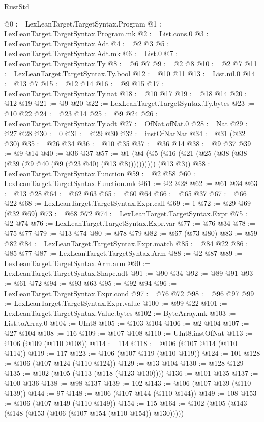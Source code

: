 \begin{lexlean}{RustStd}
\begin{coremodule}
@0 := LexLeanTarget.TargetSyntax.Program
@1 := LexLeanTarget.TargetSyntax.Program.mk
@2 := List.cons.{0}
@3 := LexLeanTarget.TargetSyntax.Adt
@4 := @2 @3
@5 := LexLeanTarget.TargetSyntax.Adt.mk
@6 := List.{0}
@7 := LexLeanTarget.TargetSyntax.Ty
@8 := @6 @7
@9 := @2 @8
@10 := @2 @7
@11 := LexLeanTarget.TargetSyntax.Ty.bool
@12 := @10 @11
@13 := List.nil.{0}
@14 := @13 @7
@15 := @12 @14
@16 := @9 @15
@17 := LexLeanTarget.TargetSyntax.Ty.nat
@18 := @10 @17
@19 := @18 @14
@20 := @12 @19
@21 := @9 @20
@22 := LexLeanTarget.TargetSyntax.Ty.bytes
@23 := @10 @22
@24 := @23 @14
@25 := @9 @24
@26 := LexLeanTarget.TargetSyntax.Ty.adt
@27 := OfNat.ofNat.{0}
@28 := Nat
@29 := @27 @28
@30 := 0
@31 := @29 @30
@32 := instOfNatNat
@34 := @31 (@32 @30)
@35 := @26 @34
@36 := @10 @35
@37 := @36 @14
@38 := @9 @37
@39 := @9 @14
@40 := @36 @37
@57 := @1 (@4 (@5 (@16 (@21 (@25 (@38 (@38 (@39 (@9 @40 (@9 (@23 @40) (@13 @8)))))))))) (@13 @3))
@58 := LexLeanTarget.TargetSyntax.Function
@59 := @2 @58
@60 := LexLeanTarget.TargetSyntax.Function.mk
@61 := @2 @28
@62 := @61 @34
@63 := @13 @28
@64 := @62 @63
@65 := @60 @64
@66 := @65 @37
@67 := @66 @22
@68 := LexLeanTarget.TargetSyntax.Expr.call
@69 := 1
@72 := @29 @69 (@32 @69)
@73 := @68 @72
@74 := LexLeanTarget.TargetSyntax.Expr
@75 := @2 @74
@76 := LexLeanTarget.TargetSyntax.Expr.var
@77 := @76 @34
@78 := @75 @77
@79 := @13 @74
@80 := @78 @79
@82 := @67 (@73 @80)
@83 := @59 @82
@84 := LexLeanTarget.TargetSyntax.Expr.match
@85 := @84 @22
@86 := @85 @77
@87 := LexLeanTarget.TargetSyntax.Arm
@88 := @2 @87
@89 := LexLeanTarget.TargetSyntax.Arm.arm
@90 := LexLeanTarget.TargetSyntax.Shape.adt
@91 := @90 @34
@92 := @89 @91
@93 := @61 @72
@94 := @93 @63
@95 := @92 @94
@96 := LexLeanTarget.TargetSyntax.Expr.cond
@97 := @76 @72
@98 := @96 @97
@99 := LexLeanTarget.TargetSyntax.Expr.value
@100 := @99 @22
@101 := LexLeanTarget.TargetSyntax.Value.bytes
@102 := ByteArray.mk
@103 := List.toArray.{0}
@104 := UInt8
@105 := @103 @104
@106 := @2 @104
@107 := @27 @104
@108 := 116
@109 := @107 @108
@110 := UInt8.instOfNat
@113 := @106 (@109 (@110 @108))
@114 := 114
@118 := @106 (@107 @114 (@110 @114))
@119 := 117
@123 := @106 (@107 @119 (@110 @119))
@124 := 101
@128 := @106 (@107 @124 (@110 @124))
@129 := @13 @104
@130 := @128 @129
@135 := @102 (@105 (@113 (@118 (@123 @130))))
@136 := @101 @135
@137 := @100 @136
@138 := @98 @137
@139 := 102
@143 := @106 (@107 @139 (@110 @139))
@144 := 97
@148 := @106 (@107 @144 (@110 @144))
@149 := 108
@153 := @106 (@107 @149 (@110 @149))
@154 := 115
@164 := @102 (@105 (@143 (@148 (@153 (@106 (@107 @154 (@110 @154)) @130)))))

\end{coremodule}
\end{lexlean}
